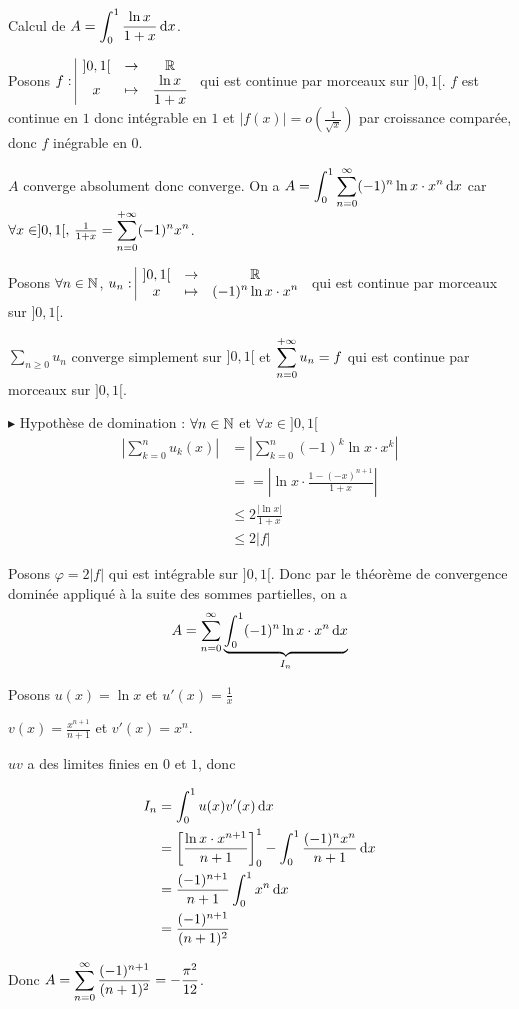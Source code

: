 \begin{exemple}
    Calcul de $A = \displaystyle \int_0^1 \frac{\ln x}{1 + x} \,\mathrm{d}x$.

    Posons $f: \space \begin{array}{|ccc} \displaystyle ]0, 1[ & \to & \displaystyle \mathbb{R} \\ \displaystyle x & \mapsto & \displaystyle \frac{\ln x}{1 + x} \end{array}$ 
    qui est continue par morceaux sur $]0, 1[$. $f$ est continue en $1$ donc intégrable en $1$
    et $|f(x)| = o\left(\frac 1 {\sqrt x} \right)$ par croissance comparée, donc $f$ inégrable en $0$. 

    $A$ converge absolument donc converge. On a $\displaystyle A = \int_{0}^{1 } \sum_{n = 0}^{\infty} (-1)^n \ln x \cdot x^n \,\mathrm{d}x$
    car $\forall x \in ]0, 1[, \, \frac 1 {1 + x} = \displaystyle \sum_{n = 0}^{+ \infty} (-1)^n x^n$.

    Posons $\forall n \in \mathbb{N}$, $u_n: \space \begin{array}{|ccc} \displaystyle ]0, 1[ & \to & \displaystyle \mathbb{R} \\ \displaystyle x & \mapsto & \displaystyle (-1)^n \ln x \cdot x^n \end{array}$ qui est continue par morceaux sur $]0, 1[$.

    $\sum_{n \geqslant 0} u_n$ converge simplement sur $]0, 1[$ et $\displaystyle \sum_{n = 0}^{+ \infty} u_n = f$ qui est continue par morceaux sur $]0, 1[$.

    \avspace $\blacktriangleright$ Hypothèse de domination : $\forall n \in \mathbb{N}$ et $\forall 
    x \in ]0, 1[$\begin{align}
        \left| \sum_{k = 0 }^{n } u_k(x) \right| & = \left| \sum_{k = 0}^{n } (-1)^k \ln x \cdot x^k \right| \\
        & == \left| \ln x \cdot \frac{1 - (-x)^{n + 1}}{1 + x} \right| \\
        & \leqslant 2 \frac{|\ln x|}{1+x} \\
        & \leqslant 2 |f|
    \end{align}

    Posons $\varphi = 2 |f|$ qui est intégrable sur $]0, 1[$. Donc par le théorème de convergence dominée 
    appliqué à la suite des sommes partielles, on a 
    $$A = \sum_{n=0}^{\infty} \underbrace{\int_{0}^{1} (-1)^n \ln x \cdot x^n \,\mathrm{d}x}_{I_n}$$

    Posons $u(x) = \ln x$ et $u'(x) = \frac 1 x$ 

    $v(x) = \frac{x^{n + 1}}{n + 1}$ et $v'(x) = x^n$.

    $uv$ a des limites finies en $0$ et $1$, donc 
    
    \begin{align}
    I_n & = \int_0^1 u(x) v'(x) \,\mathrm{d}x \\
    & = \left[ \frac{\ln x \cdot x^{n+1}}{n + 1} \right]_0^1 - \int_0^1 \frac{(-1)^nx^n}{n+1} \,\mathrm{d}x \\
    & = \frac{(-1)^{n+1}}{n + 1} \int_0^1 x^n \,\mathrm{d}x \\
    & = \frac{(-1)^{n+1}}{(n + 1)^2}
    \end{align}

    Donc $A = \displaystyle \sum_{n = 0 }^{\infty} \frac{(-1)^{n+1}}{(n + 1)^2} = - \frac{\pi^2}{12}$.

\end{exemple}

